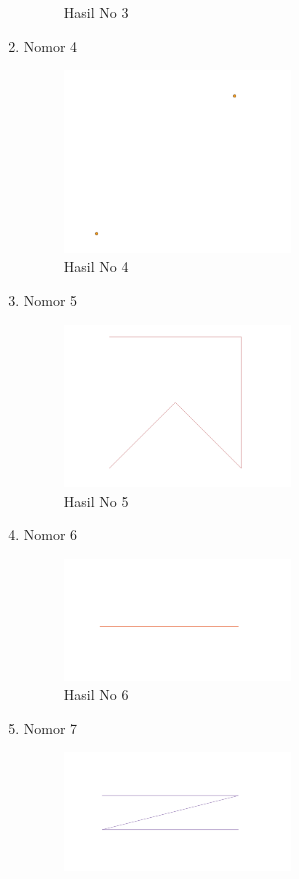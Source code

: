 \begin{enumerate}
\begin{figure}[H]
		\centering
		\caption{Hasil No 3}
	\end{figure}
	\item Nomor 4
	
	\begin{figure}[H]
        \includegraphics[width=6cm]{figures/1174051/2/4.PNG}
		\centering
		\caption{Hasil No 4}
	\end{figure}
	\item Nomor 5
	
	\begin{figure}[H]
        \includegraphics[width=6cm]{figures/1174051/2/5.PNG}
		\centering
		\caption{Hasil No 5}
	\end{figure}
	\item Nomor 6
	
	\begin{figure}[H]
        \includegraphics[width=6cm]{figures/1174051/2/6.PNG}
		\centering
		\caption{Hasil No 6}
	\end{figure}
	\item Nomor 7
	
	\begin{figure}[H]
        \includegraphics[width=6cm]{figures/1174051/2/7.PNG}

\end{figure}
\end{enumerate}
